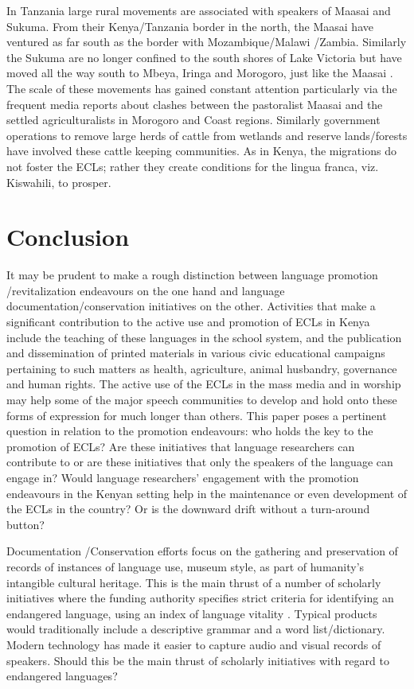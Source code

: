 \documentclass[output=paper,colorlinks,citecolor=brown]{langscibook}
\begin{document}
In Tanzania large rural movements are associated with speakers of Maasai and Sukuma. From their Kenya\slash Tanzania border in the north, the Maasai have ventured as far south as the border with Mozambique/Malawi /Zambia. Similarly the Sukuma are no longer confined to the south shores of Lake Victoria but have moved all the way south to Mbeya, Iringa and Morogoro, just like the Maasai \citep{MuzaleRugemalira2008}. The scale of these movements has gained constant attention particularly via the frequent media reports about clashes between the pastoralist Maasai and the settled agriculturalists in Morogoro and Coast regions. Similarly government operations to remove large herds of cattle from wetlands and reserve lands\slash forests have involved these cattle keeping communities. As in Kenya, the migrations do not foster the ECLs; rather they create conditions for the lingua franca, viz. Kiswahili, to prosper.

\section{Conclusion}\label{sec:kioko:7}

It may be prudent to make a rough distinction between language promotion /revitalization endeavours on the one hand and language documentation/conservation initiatives on the other.  Activities that make a significant contribution to the active use and promotion of ECLs in Kenya include the teaching of these languages in the school system, and the publication and dissemination of printed materials in various civic educational campaigns pertaining to such matters as health, agriculture, animal husbandry, governance and human rights. The active use of the ECLs in the mass media and in worship may help some of the major speech communities to develop and hold onto these forms of expression for much longer than others.  This paper poses a pertinent question in relation to the promotion endeavours:  who holds the key to the promotion of ECLs? Are these initiatives that language researchers can contribute to or are these initiatives that only the speakers of the language can engage in? Would language researchers’ engagement with the promotion endeavours in the Kenyan setting help in the maintenance or even development of the ECLs in the country? Or is the downward drift without a turn-around button?

Documentation /Conservation efforts focus on the gathering and preservation of records of instances of language use, museum style, as part of humanity’s intangible cultural heritage. This is the main thrust of a number of scholarly initiatives where the funding authority specifies strict criteria for identifying an endangered language, using an index of language vitality \citep{UNESCO2003}. Typical products would traditionally include a descriptive grammar and a word list\slash dictionary. Modern technology has made it easier to capture audio and visual records of speakers. Should this be the main thrust of scholarly initiatives with regard to endangered languages?
\end{document}
